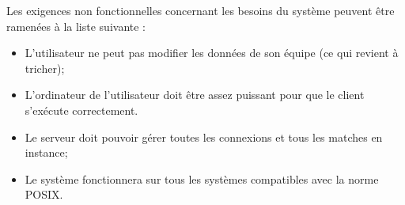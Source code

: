 Les exigences non fonctionnelles concernant les besoins du système peuvent être ramenées à la liste suivante :
\begin{itemize}
\item L'utilisateur ne peut pas modifier les données de son équipe (ce qui revient à tricher);
\item L'ordinateur de l'\gls{utilisateur} doit être assez puissant pour que le 
	   \gls{client} s'exécute correctement.
\item Le \gls{serveur} doit pouvoir gérer toutes les connexions et tous les matches 
	   en instance;
\item Le système fonctionnera sur tous les systèmes compatibles avec la norme POSIX.
\end{itemize}
